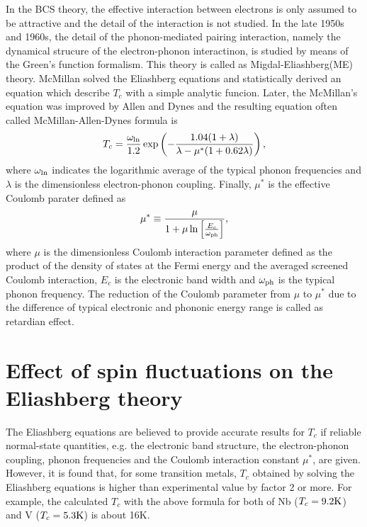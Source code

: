 In the BCS theory, the effective interaction between electrons is only assumed to be attractive and
the detail of the interaction is not studied.
In the late 1950s and 1960s, the detail of the phonon-mediated pairing interaction, namely the 
dynamical strucure of the electron-phonon interactinon, is studied by means of the Green's function 
formalism\cite{Migdal1958,Nambu1960,Eliashberg1960,Morel1962,Schrieffer1964,Scalapino1966}. 
This theory is called as Migdal-Eliashberg(ME) theory.
McMillan\cite{McMillan1968} solved the Eliashberg equations\cite{Parks1969}
and statistically derived an equation which describe $T_c$ with a simple analytic funcion. 
Later, the McMillan's equation was improved by Allen and Dynes\cite{AllenDynes} and the resulting 
equation often called McMillan-Allen-Dynes formula is
%
\begin{equation}
	T_c = \frac{\omega_{\rm ln}}{1.2} \exp \left( -\frac{1.04(1+\lambda)}
	{\lambda-\mu^{\ast}(1+0.62\lambda)} \right),
	\label{eq:Allen}
\end{equation}
%
where $\omega_{\rm ln}$ indicates the logarithmic average of the typical phonon frequencies and
$\lambda$ is the dimensionless electron-phonon coupling. Finally, $\mu^{\ast}$ is the effective Coulomb
parater defined as
%
\begin{equation}
	\mu^{\ast} \equiv \frac{\mu}{1 + \mu \ln \left[ \frac{E_c}{\omega_{\rm ph}} \right]},
	\label{eq:mustar}
\end{equation}
%
where $\mu$ is the dimensionless Coulomb interaction parameter defined as the product of the density
of states at the Fermi energy and the averaged screened Coulomb interaction, $E_c$ is the
electronic band width and $\omega_{\rm ph}$ is the typical phonon frequency.
The reduction of the Coulomb parameter from $\mu$ to $\mu^{\ast}$ due to the difference of 
typical electronic and phononic energy range is called as retardian effect\cite{Bogo1958,Morel1962}.

\section{Effect of spin fluctuations on the Eliashberg theory} %
The Eliashberg equations are believed to provide accurate results for $T_c$
if reliable normal-state quantities, e.g. the electronic band structure, the electron-phonon coupling,
phonon frequencies and the Coulomb interaction constant $\mu^{\ast}$, are given.
However, it is found that, for some transition metals, $T_c$ obtained by solving the 
Eliashberg equations is higher than experimental value by factor 2 or more.
For example, the calculated $T_c$ with the above formula for both of Nb ($T_c = 9.2 \rm K$) 
and V ($T_c = 5.3 \rm K$) is about 16K\cite{Papa1977}. 

